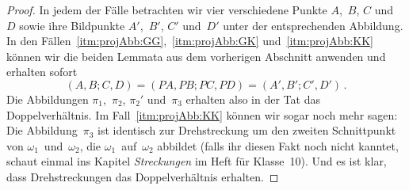 \begin{proof}
	In jedem der Fälle betrachten wir vier verschiedene Punkte $A$,~$B$, $C$ und~$D$ sowie ihre Bildpunkte $A'$,~$B'$, $C'$ und~$D'$ unter der entsprechenden Abbildung. In den Fällen~\ref{itm:projAbb:GG},~\ref{itm:projAbb:GK} und~\ref{itm:projAbb:KK} können wir die beiden Lemmata aus dem vorherigen Abschnitt anwenden und erhalten sofort
	\begin{equation*}
		(A,B;C,D)=(PA,PB;PC,PD)=(A',B';C',D')\,. 
	\end{equation*}
	Die Abbildungen $\pi_1$,~$\pi_2$, $\pi_2'$ und~$\pi_3$ erhalten also in der Tat das Doppelverhältnis. Im Fall~\ref{itm:projAbb:KK} können wir sogar noch mehr sagen: Die Abbildung~$\pi_3$ ist identisch zur Drehstreckung um den zweiten Schnittpunkt von $\omega_1$~und~$\omega_2$, die $\omega_1$~auf~$\omega_2$ abbildet (falls ihr diesen Fakt noch nicht kanntet, schaut einmal ins Kapitel \emph{Streckungen} im Heft für Klasse~10). Und es ist klar, dass Drehstreckungen das Doppelverhältnis erhalten.
	

\end{proof}

